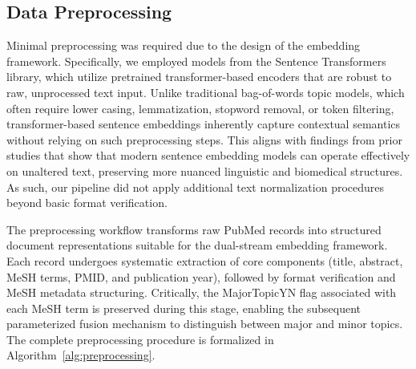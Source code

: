 \documentclass{ieeeaccess}
\begin{document}
\subsection{Data Preprocessing}
Minimal preprocessing was required due to the design of the embedding framework. Specifically, we employed models from the Sentence Transformers library, which utilize pretrained transformer-based encoders that are robust to raw, unprocessed text input\cite{reimers_sentence-bert_2019}. Unlike traditional bag-of-words topic models, which often require lower casing, lemmatization, stopword removal, or token filtering, transformer-based sentence embeddings inherently capture contextual semantics without relying on such preprocessing steps. This aligns with findings from prior studies that show that modern sentence embedding models can operate effectively on unaltered text, preserving more nuanced linguistic and biomedical structures\cite{wang_graph-embedded_2022}. As such, our pipeline did not apply additional text normalization procedures beyond basic format verification.

The preprocessing workflow transforms raw PubMed records into structured document representations suitable for the dual-stream embedding framework. Each record undergoes systematic extraction of core components (title, abstract, MeSH terms, PMID, and publication year), followed by format verification and MeSH metadata structuring. Critically, the MajorTopicYN flag associated with each MeSH term is preserved during this stage, enabling the subsequent parameterized fusion mechanism to distinguish between major and minor topics. The complete preprocessing procedure is formalized in Algorithm~\ref{alg:preprocessing}.
\end{document}
